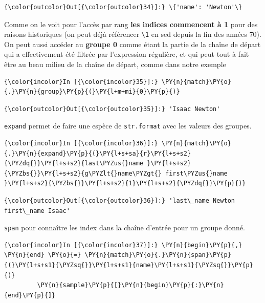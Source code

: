 \begin{Verbatim}[commandchars=\\\{\}]
{\color{outcolor}Out[{\color{outcolor}34}]:} \{'name': 'Newton'\}
\end{Verbatim}
            
    Comme on le voit pour l'accès par rang \textbf{les indices commencent à
1} pour des raisons historiques (on peut déjà référencer
\texttt{\textbackslash{}1} en sed depuis la fin des années 70).\\

On peut aussi accéder au \textbf{groupe 0} comme étant la partie de la
chaîne de départ qui a effectivement été filtrée par l'expression
régulière, et qui peut tout à fait être au beau milieu de la chaîne de
départ, comme dans notre exemple

    \begin{Verbatim}[commandchars=\\\{\}]
{\color{incolor}In [{\color{incolor}35}]:} \PY{n}{match}\PY{o}{.}\PY{n}{group}\PY{p}{(}\PY{l+m+mi}{0}\PY{p}{)}
\end{Verbatim}


\begin{Verbatim}[commandchars=\\\{\}]
{\color{outcolor}Out[{\color{outcolor}35}]:} 'Isaac Newton'
\end{Verbatim}
            
    \texttt{expand} permet de faire une espèce de \texttt{str.format} avec
les valeurs des groupes.

    \begin{Verbatim}[commandchars=\\\{\}]
{\color{incolor}In [{\color{incolor}36}]:} \PY{n}{match}\PY{o}{.}\PY{n}{expand}\PY{p}{(}\PY{l+s+sa}{r}\PY{l+s+s2}{\PYZdq{}}\PY{l+s+s2}{last\PYZus{}name }\PY{l+s+s2}{\PYZbs{}}\PY{l+s+s2}{g\PYZlt{}name\PYZgt{} first\PYZus{}name }\PY{l+s+s2}{\PYZbs{}}\PY{l+s+s2}{1}\PY{l+s+s2}{\PYZdq{}}\PY{p}{)}
\end{Verbatim}


\begin{Verbatim}[commandchars=\\\{\}]
{\color{outcolor}Out[{\color{outcolor}36}]:} 'last\_name Newton first\_name Isaac'
\end{Verbatim}
            
    \texttt{span} pour connaître les index dans la chaîne d'entrée pour un
groupe donné.

    \begin{Verbatim}[commandchars=\\\{\}]
{\color{incolor}In [{\color{incolor}37}]:} \PY{n}{begin}\PY{p}{,} \PY{n}{end} \PY{o}{=} \PY{n}{match}\PY{o}{.}\PY{n}{span}\PY{p}{(}\PY{l+s+s1}{\PYZsq{}}\PY{l+s+s1}{name}\PY{l+s+s1}{\PYZsq{}}\PY{p}{)}
         \PY{n}{sample}\PY{p}{[}\PY{n}{begin}\PY{p}{:}\PY{n}{end}\PY{p}{]}
\end{Verbatim}



